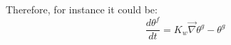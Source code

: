 Therefore, for instance it could be:
\begin{equation}
\frac{d \theta^f}{dt} = K_w \vec{\nabla}{\theta^g - \theta^g}
\end{equation}